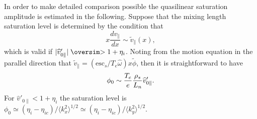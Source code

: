 \documentclass[a4paper,openany,12pt]{book}
\def\nms{\mathsurround=0pt}
\def\gtsim{\mathrel{\mathpalette\oversim>}} %
\def\oversim#1#2{\lower 2pt\vbox{\baselineskip 0pt \lineskip 1pt
    \ialign{$\nms#1\hfil##\hfil$\crcr#2\crcr\sim\crcr}}}
\begin{document}
{In order to make detailed comparison possible the quasilinear saturation amplitude is estimated in the following. Suppose that the mixing length saturation level is determined by the condition that
\begin{equation}
x\frac{dv_\|}{dx}\sim\widetilde v_\|(x),
\label{E9.55}
\end{equation}
which is valid if $|\widehat v'_{0\|}|\gtsim 1+\eta_i$. Noting from the motion equation in the parallel direction that $\widetilde v_\|=(\mbox{esc}_s/T_e\widehat\omega)x\widetilde\phi$, then it is straightforward to have
\begin{equation}
\phi_0\sim {T_e\over e}{\rho_s\over L_n}\widehat v'_{0\|}.\label{E9.56}
\end{equation}
For $\widehat v'_{0\|}<1+\eta_i$ the saturation level is $\phi_0\simeq(\eta_i-\eta_{ic})/\langle k_x^2\rangle^{1/2}\simeq(\eta_i-\eta_{ic})/\langle k_y^2\rangle^{1/2}$.\\

}
\end{document}
